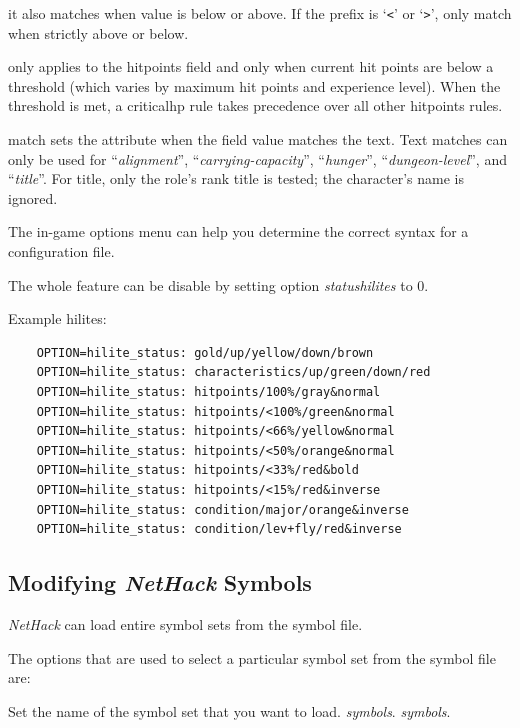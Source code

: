 \documentclass[titlepage]{article}
\begin{document}
\begin{description}[font=\mdseries\ttfamily]
it also matches when value is below or above.
If the prefix is `\texttt{<}' or `\texttt{>}', only match when strictly
above or below.
\item[criticalhp] only applies to the hitpoints field and only
when current hit points are below a threshold (which varies by maximum
hit points and experience level).
When the threshold is met, a criticalhp rule takes precedence over all
other hitpoints rules.
\item[text] match sets the attribute when the field value
matches the text.
Text matches can only be used for ``\textit{alignment}'',
``\textit{carrying-capacity}'', ``\textit{hunger}'', ``\textit{dungeon-level}'',
and ``\textit{title}''.
For title, only the role's rank title
is tested; the character's name is ignored.
\end{description}

The in-game options menu can help you determine the correct syntax for a
configuration file.

The whole feature can be disable by setting option \textit{statushilites} to 0.

Example hilites:
\begin{verbatim}
    OPTION=hilite_status: gold/up/yellow/down/brown
    OPTION=hilite_status: characteristics/up/green/down/red
    OPTION=hilite_status: hitpoints/100%/gray&normal
    OPTION=hilite_status: hitpoints/<100%/green&normal
    OPTION=hilite_status: hitpoints/<66%/yellow&normal
    OPTION=hilite_status: hitpoints/<50%/orange&normal
    OPTION=hilite_status: hitpoints/<33%/red&bold
    OPTION=hilite_status: hitpoints/<15%/red&inverse
    OPTION=hilite_status: condition/major/orange&inverse
    OPTION=hilite_status: condition/lev+fly/red&inverse
\end{verbatim}

\subsection*{Modifying \textit{NetHack} Symbols}

\textit{NetHack} can load entire symbol sets from the symbol file.

The options that are used to select a particular symbol set from the
symbol file are:

\begin{description}[font=\mdseries\itshape]
\item[symset]
Set the name of the symbol set that you want to load.
{\it symbols\/}.
\textit{symbols}.
\end{description}
\end{document}
